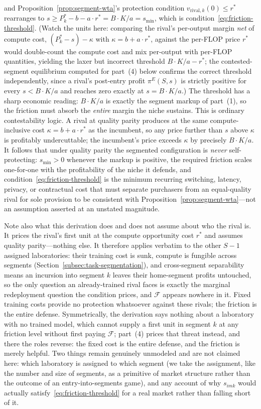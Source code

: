 \documentclass[11pt]{article}
\begin{document}
and Proposition~\ref{prop:segment-wta}'s protection condition $v_{\mathrm{rival},k}(0)\leq r^*$ rearranges to $s\geq P_k^*-b-a\cdot r^*=B\cdot K/a=s_{\min}$, which is condition~\eqref{eq:friction-threshold}. (Watch the units here: comparing the rival's per-output margin \emph{net} of compute cost, $(P_k^*-s)-\kappa$ with $\kappa=b+a\cdot r^*$, against the per-FLOP price $r^*$ would double-count the compute cost and mix per-output with per-FLOP quantities, yielding the laxer but incorrect threshold $B\cdot K/a-r^*$; the contested-segment equilibrium computed for part~(4) below confirms the correct threshold independently, since a rival's post-entry profit $\pi^{E}(S,s)$ is strictly positive for every $s<B\cdot K/a$ and reaches zero exactly at $s=B\cdot K/a$.) The threshold has a sharp economic reading: $B\cdot K/a$ is exactly the segment markup of part~(1), so the friction must absorb the \emph{entire} margin the niche sustains. This is ordinary contestability logic. A rival at quality parity produces at the same compute-inclusive cost $\kappa=b+a\cdot r^*$ as the incumbent, so any price further than $s$ above $\kappa$ is profitably undercuttable; the incumbent's price exceeds $\kappa$ by precisely $B\cdot K/a$. It follows that under quality parity the segmented configuration is \emph{never} self-protecting: $s_{\min}>0$ whenever the markup is positive, the required friction scales one-for-one with the profitability of the niche it defends, and condition~\eqref{eq:friction-threshold} is the minimum recurring switching, latency, privacy, or contractual cost that must separate purchasers from an equal-quality rival for sole provision to be consistent with Proposition~\ref{prop:segment-wta}---not an assumption asserted at an unstated magnitude.

Note also what this derivation does and does not assume about who the rival is. It prices the rival's first unit at the compute opportunity cost $r^{*}$ and assumes quality parity---nothing else. It therefore applies verbatim to the other $S-1$ assigned laboratories: their training cost is sunk, compute is fungible across segments (Section~\ref{subsec:task-segmentation}), and cross-segment separability means an incursion into segment $k$ leaves their home-segment profits untouched, so the only question an already-trained rival faces is exactly the marginal redeployment question the condition prices, and $\mathcal F$ appears nowhere in it. Fixed training costs provide no protection whatsoever against these rivals; the friction is the entire defense. Symmetrically, the derivation says nothing about a laboratory with no trained model, which cannot supply a first unit in segment $k$ at any friction level without first paying $\mathcal F$; part~(4) prices that threat instead, and there the roles reverse: the fixed cost is the entire defense, and the friction is merely helpful. Two things remain genuinely unmodeled and are not claimed here: which laboratory is assigned to which segment (we take the assignment, like the number and size of segments, as a primitive of market structure rather than the outcome of an entry-into-segments game), and any account of why $s_{imk}$ would actually satisfy~\eqref{eq:friction-threshold} for a real market rather than falling short of it.
\end{document}
